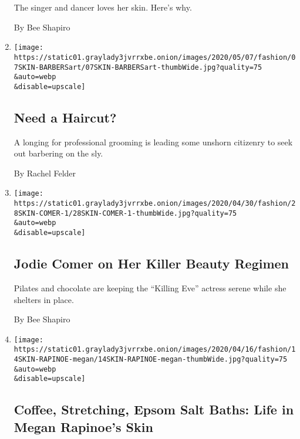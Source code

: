 \begin{enumerate}
  The singer and dancer loves her skin. Here's why.

  By Bee Shapiro
\item
  \href{/2020/05/06/style/coronavirus-haircuts-barbers.html}{}

  \texttt{[image: https://static01.graylady3jvrrxbe.onion/images/2020/05/07/fashion/07SKIN-BARBERSart/07SKIN-BARBERSart-thumbWide.jpg?quality=75\\\&auto=webp\\\&disable=upscale]}

  \hypertarget{need-a-haircut}{%
  \subsection{Need a Haircut?}\label{need-a-haircut}}

  A longing for professional grooming is leading some unshorn citizenry
  to seek out barbering on the sly.

  By Rachel Felder
\item
  \href{/2020/04/28/style/beauty-skin-care-jodie-comer-on-her-killer-beauty-regimen.html}{}

  \texttt{[image: https://static01.graylady3jvrrxbe.onion/images/2020/04/30/fashion/28SKIN-COMER-1/28SKIN-COMER-1-thumbWide.jpg?quality=75\\\&auto=webp\\\&disable=upscale]}

  \hypertarget{jodie-comer-on-her-killer-beauty-regimen}{%
  \subsection{Jodie Comer on Her Killer Beauty
  Regimen}\label{jodie-comer-on-her-killer-beauty-regimen}}

  Pilates and chocolate are keeping the ``Killing Eve'' actress serene
  while she shelters in place.

  By Bee Shapiro
\item
  \href{/2020/04/14/fashion/megan-rapinoe-skin-care.html}{}

  \texttt{[image: https://static01.graylady3jvrrxbe.onion/images/2020/04/16/fashion/14SKIN-RAPINOE-megan/14SKIN-RAPINOE-megan-thumbWide.jpg?quality=75\\\&auto=webp\\\&disable=upscale]}

  \hypertarget{coffee-stretching-epsom-salt-baths-life-in-megan-rapinoes-skin}{%
  \subsection{Coffee, Stretching, Epsom Salt Baths: Life in Megan
  Rapinoe's
  Skin}\label{coffee-stretching-epsom-salt-baths-life-in-megan-rapinoes-skin}}


\end{enumerate}
